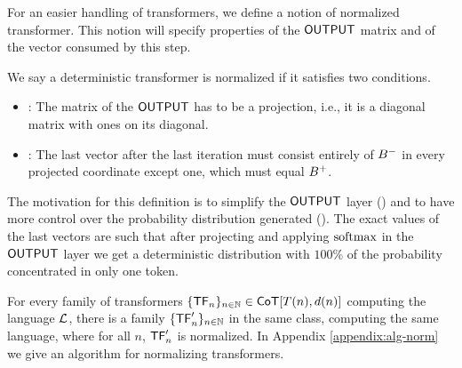 For an easier handling of transformers, we define a notion of normalized transformer.
This notion will specify properties of the $\mathsf{OUTPUT}$ matrix and of the vector consumed by this step.

\begin{definition}
    We say a deterministic transformer is normalized if it satisfies two conditions. 
    \begin{itemize}
        \item \projection : The matrix of the $\mathsf{OUTPUT}$ has to be a projection, i.e., it is a diagonal matrix with ones on its diagonal.
        \item \concentrated : The last vector after the last iteration must consist entirely of $B^{-}$ in every projected coordinate except one, which must equal $B^{+}$.
    \end{itemize}
\end{definition}

The motivation for this definition is to simplify the $\mathsf{OUTPUT}$ layer (\projection) and to have more control over the probability distribution generated (\concentrated). The exact values of the last vectors are such that after projecting and applying $\mathrm{softmax}$ in the $\mathsf{OUTPUT}$ layer we get a deterministic distribution with $100\%$ of the probability concentrated in only one token.

For every family of transformers $\{\mathsf{TF}_{n}\}_{n \in \mathbb{N}} \in \mathsf{CoT}[T(n), d(n)]$ computing the language $\mathcal{L}$, there is a family $\{\mathsf{TF}'_{n}\}_{n \in \mathbb{N}}$ in the same class, computing the same language, where for all $n$, $\mathsf{TF}'_n$ is normalized.
In Appendix \ref{appendix:alg-norm} we give an algorithm for normalizing transformers.


